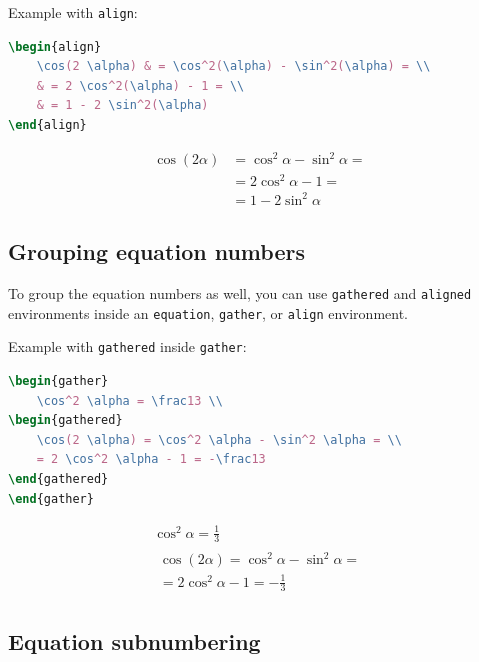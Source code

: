 Example with \lstinline[language=TeX]|align|:
\begin{lstlisting}[language=TeX]
\begin{align}
    \cos(2 \alpha) & = \cos^2(\alpha) - \sin^2(\alpha) = \\
    & = 2 \cos^2(\alpha) - 1 = \\
    & = 1 - 2 \sin^2(\alpha)
\end{align}
\end{lstlisting}
\begin{align}
    \cos(2 \alpha) & = \cos^2 \alpha - \sin^2 \alpha = \\
    & = 2 \cos^2 \alpha - 1 = \\
    & = 1 - 2 \sin^2 \alpha
\end{align}

\subsection{Grouping equation numbers}
\label{sec:grouping_numbers}

To group the equation numbers as well, you can use \lstinline[language=TeX]|gathered| and \lstinline[language=TeX]|aligned| environments inside an \lstinline[language=TeX]|equation|, \lstinline[language=TeX]|gather|, or \lstinline[language=TeX]|align| environment.

Example with \lstinline[language=TeX]|gathered| inside \lstinline[language=TeX]|gather|:
\begin{lstlisting}[language=TeX]
\begin{gather}
    \cos^2 \alpha = \frac13 \\
\begin{gathered}
    \cos(2 \alpha) = \cos^2 \alpha - \sin^2 \alpha = \\
    = 2 \cos^2 \alpha - 1 = -\frac13
\end{gathered}
\end{gather}
\end{lstlisting}
\begin{gather}
    \cos^2 \alpha = \frac13 \\
\begin{gathered}
    \cos(2 \alpha) = \cos^2 \alpha - \sin^2 \alpha = \\
    = 2 \cos^2 \alpha - 1 = -\frac13
\end{gathered}
\end{gather}

\subsection{Equation subnumbering}

